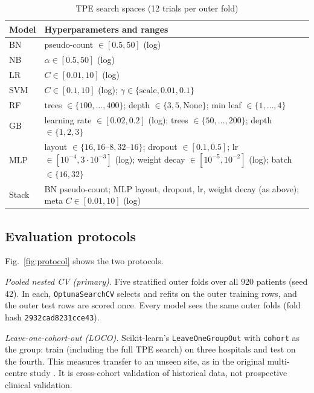 \documentclass[conference]{IEEEtran}
\newcommand{\code}[1]{\texttt{\small #1}}
\begin{document}
\begin{table}[t]
\caption{TPE search spaces (12 trials per outer fold)}
\label{tab:space}
\centering
\scriptsize
\begin{tabular}{p{}p{}}
\toprule
Model & Hyperparameters and ranges \\
\midrule
BN & pseudo-count $\in[0.5, 50]$ (log) \\
NB & $\alpha\in[0.5, 50]$ (log) \\
LR & $C\in[0.01, 10]$ (log) \\
SVM & $C\in[0.1, 10]$ (log); $\gamma\in\{\text{scale}, 0.01, 0.1\}$ \\
RF & trees $\in\{100,\dots,400\}$; depth $\in\{3,5,\text{None}\}$; min leaf $\in\{1,\dots,4\}$ \\
GB & learning rate $\in[0.02,0.2]$ (log); trees $\in\{50,\dots,200\}$; depth $\in\{1,2,3\}$ \\
MLP & layout $\in\{16, 16\text{--}8, 32\text{--}16\}$; dropout $\in[0.1,0.5]$; lr $\in[10^{-4}, 3\cdot10^{-3}]$ (log); weight decay $\in[10^{-5},10^{-2}]$ (log); batch $\in\{16,32\}$ \\
Stack & BN pseudo-count; MLP layout, dropout, lr, weight decay (as above); meta $C\in[0.01,10]$ (log) \\
\bottomrule
\end{tabular}
\end{table}

\subsection{Evaluation protocols}
Fig.~\ref{fig:protocol} shows the two protocols.

\textit{Pooled nested CV (primary).} Five stratified outer folds over all 920 patients (seed 42). In each, \code{OptunaSearchCV} selects and refits on the outer training rows, and the outer test rows are scored once. Every model sees the same outer folds (fold hash \code{2932cad8231cce43}).

\textit{Leave-one-cohort-out (LOCO).} Scikit-learn's \code{LeaveOneGroupOut} with \code{cohort} as the group: train (including the full TPE search) on three hospitals and test on the fourth. This measures transfer to an unseen site, as in the original multi-centre study \cite{detrano}. It is cross-cohort validation of historical data, not prospective clinical validation.
\end{document}
